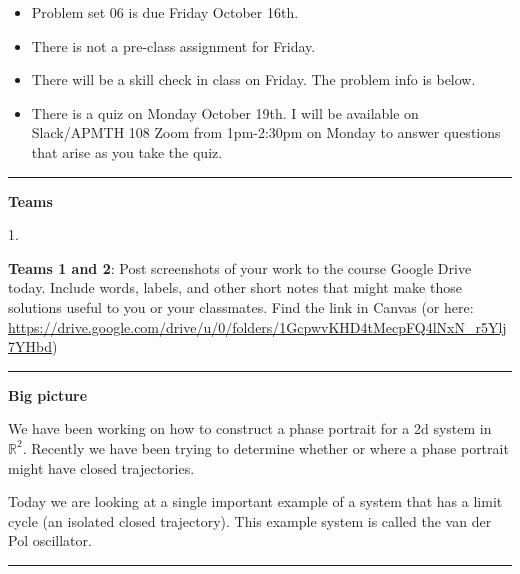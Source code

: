 \documentclass[12pt,letterpaper,noanswers]{exam}
\begin{document}
 \pdfpageheight 11in 
  \pdfpagewidth 8.5in

\noindent 




\begin{itemize}
    \item Problem set 06 is due Friday October 16th.
    \item There is not a pre-class assignment for Friday.
    \item There will be a skill check in class on Friday.  The problem info is below.
    \item There is a quiz on Monday October 19th.  I will be available on Slack/APMTH 108 Zoom from 1pm-2:30pm on Monday to answer questions that arise as you take the quiz.
\end{itemize}

\hrule
\vspace{0.2cm}



\noindent\textbf{Teams}

\begin{multicols}{2}
1. 
\end{multicols}

\noindent \textbf{Teams 1 and 2}: Post screenshots of your work to the course Google Drive today.  Include words, labels, and other short notes that might make those solutions useful to you or your classmates.  Find the link in Canvas (or here: \url{https://drive.google.com/drive/u/0/folders/1GcpwvKHD4tMecpFQ4lNxN_r5Ylj7YHbd})

\vspace{0.2cm}

\hrule
\vspace{0.2cm}

\noindent\textbf{Big picture}

We have been working on how to construct a phase portrait for a 2d system in $\mathbb{R}^2.$ Recently we have been trying to determine whether or where a phase portrait might have closed trajectories.  

Today we are looking at a single important example of a system that has a limit cycle (an isolated closed trajectory).  This example system is called the van der Pol oscillator.


\vspace{0.2cm}
\hrule
\vspace{0.2cm}
\end{document}
